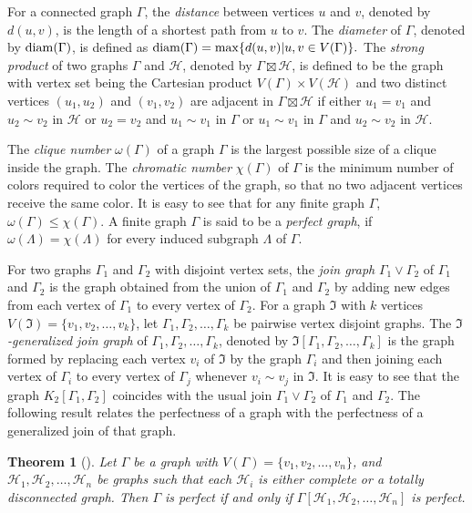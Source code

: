 \documentclass[12pt,a4paper]{article}
\newtheorem{theorem}{Theorem}[section]
\begin{document}
For a connected graph $\Gamma$, the \emph{distance} between vertices $u$ and $v$, denoted by $d(u, v)$, is the length of a shortest path from $u$ to $v$. The \emph{diameter} of $\Gamma$, denoted by ${\rm diam}(\Gamma)$, is defined as ${\rm diam}(\Gamma)=\max\{d(u,v)|u,v\in V(\Gamma)\}.$ The \textit{strong product} of two graphs $\Gamma$ and $\mathcal{H}$, denoted by $\Gamma\boxtimes\mathcal{H}$, is defined to be the graph with vertex set being the Cartesian product $V(\Gamma)\times V(\mathcal{H})$ and two distinct vertices $(u_1,u_2)$ and $(v_1,v_2)$ are adjacent in $\Gamma\boxtimes\mathcal{H}$ if either $u_1=v_1$ and $u_2\sim v_2$ in $\mathcal{H}$ or $u_2=v_2$ and $u_1\sim v_1$ in $\Gamma$ or $u_1\sim v_1$ in $\Gamma$ and $u_2\sim v_2$ in $\mathcal{H}$. 

The \emph{clique number} $\omega(\Gamma)$ of a graph $\Gamma$ is the largest possible size of a clique inside the graph. The \emph{chromatic number} $\chi(\Gamma)$ of $\Gamma$ is the minimum number of colors required to color the vertices of the graph, so that no two adjacent vertices receive the same color. It is easy to see that for any finite graph $\Gamma$, $\omega(\Gamma)\leq \chi(\Gamma)$. A finite graph $\Gamma$ is said to be a \textit{perfect graph}, if $\omega(\Lambda)=\chi(\Lambda)$ for every induced subgraph $\Lambda$ of $\Gamma$.

For two graphs $\Gamma_1$ and $\Gamma_2$ with disjoint vertex sets, the \emph{join graph} $\Gamma_1 \vee \Gamma_2$ of $\Gamma_1$ and $\Gamma_2$  is the graph obtained from the union of $\Gamma_1$ and $\Gamma_2$ by adding new edges from each vertex of $\Gamma_1$ to every vertex of $\Gamma_2.$ For a graph $\Im$ with $k$ vertices $V(\Im) = \{v_1,v_2, \dots, v_k\}$, let $\Gamma_1, \Gamma_2, \dots, \Gamma_k$ be pairwise vertex disjoint graphs. The $\Im$\textit{-generalized join graph} of $\Gamma_1, \Gamma_2, \dots, \Gamma_k$, denoted by $\Im [\Gamma_1, \Gamma_2, \dots, \Gamma_k]$ is the graph formed by replacing each vertex $v_i$ of $\Im$ by the graph $\Gamma_i$ and then joining each vertex of $\Gamma_i$ to every vertex of $\Gamma_j$ whenever $v_i \sim v_j$ in $\Im$. It is easy to see that the graph $K_2[\Gamma_1,\Gamma_2]$ coincides with the usual join $\Gamma_1 \vee \Gamma_2$ of $\Gamma_1$ and $\Gamma_2$. The following result relates the perfectness of a graph with the perfectness of a generalized join of that graph.

\begin{theorem}[{\rm\cite[Theorem 7]{kavaskar}}]\label{perfectness of generalized join}
Let $\Gamma$ be a graph with $V(\Gamma)=\{v_1,v_2,\dots,v_n\}$, and $\mathcal{H}_1,\mathcal{H}_2,\dots,\mathcal{H}_n$ be graphs such that each $\mathcal{H}_i$ is either complete or a totally disconnected graph. Then $\Gamma$ is perfect if and only if $\Gamma[\mathcal{H}_1,\mathcal{H}_2,\dots,\mathcal{H}_n]$ is perfect.     
\end{theorem}
\end{document}
